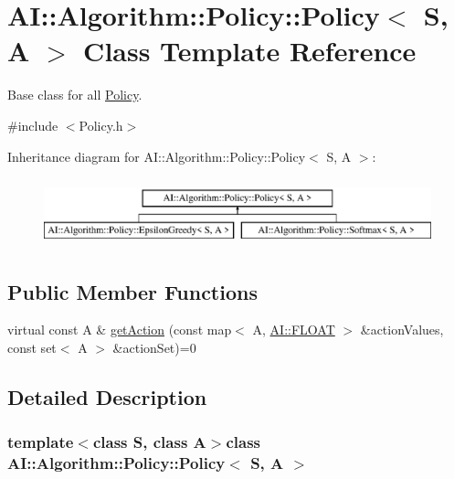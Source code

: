 \hypertarget{classAI_1_1Algorithm_1_1Policy_1_1Policy}{\section{A\-I\-:\-:Algorithm\-:\-:Policy\-:\-:Policy$<$ S, A $>$ Class Template Reference}
\label{classAI_1_1Algorithm_1_1Policy_1_1Policy}
}


Base class for all \hyperlink{classAI_1_1Algorithm_1_1Policy_1_1Policy}{Policy}.  




{\ttfamily \#include $<$Policy.\-h$>$}

Inheritance diagram for A\-I\-:\-:Algorithm\-:\-:Policy\-:\-:Policy$<$ S, A $>$\-:\begin{figure}[H]
\begin{center}
\leavevmode
\includegraphics[height=2.000000cm]{classAI_1_1Algorithm_1_1Policy_1_1Policy}
\end{center}
\end{figure}
\subsection*{Public Member Functions}
\begin{DoxyCompactItemize}
\item 
virtual const A \& \hyperlink{classAI_1_1Algorithm_1_1Policy_1_1Policy_a1bd1f511d0f5dce4f4b080232845852c}{get\-Action} (const map$<$ A, \hyperlink{namespaceAI_a41b74884a20833db653dded3918e05c3}{A\-I\-::\-F\-L\-O\-A\-T} $>$ \&action\-Values, const set$<$ A $>$ \&action\-Set)=0
\end{DoxyCompactItemize}


\subsection{Detailed Description}
\subsubsection*{template$<$class S, class A$>$class A\-I\-::\-Algorithm\-::\-Policy\-::\-Policy$<$ S, A $>$}

